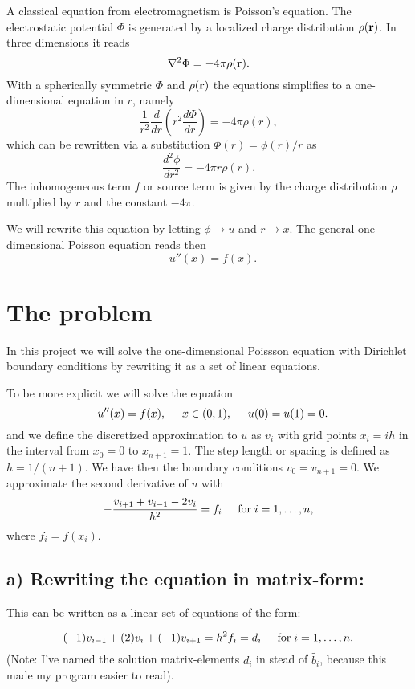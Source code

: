 \documentclass[norsk,a4paper,12pt]{article}
\begin{document}
A classical equation from electromagnetism is Poisson's equation.
The electrostatic potential $\Phi$ is generated by a localized charge
distribution $\rho ({\bf r})$.   In three dimensions 
it reads
\[
\nabla^2 \Phi = -4\pi \rho ({\bf r}).
\]
With a spherically symmetric $\Phi$ and $\rho ({\bf r})$  the equations
simplifies to a one-dimensional equation in $r$, namely
\[
\frac{1}{r^2}\frac{d}{dr}\left(r^2\frac{d\Phi}{dr}\right) = -4\pi \rho(r),
\]
which can be rewritten via a substitution $\Phi(r)= \phi(r)/r$ as
\[
\frac{d^2\phi}{dr^2}= -4\pi r\rho(r).
\]
The inhomogeneous term $f$ or source term is given by the charge distribution
$\rho$  multiplied by $r$ and the constant $-4\pi$.

We will rewrite this equation by letting $\phi\rightarrow u$ and 
$r\rightarrow x$. 
The general one-dimensional Poisson equation reads then 
\[
-u''(x) = f(x).
\]




\section{The problem}
In this project we will solve the one-dimensional Poissson equation
with Dirichlet boundary conditions by rewriting it as a set of linear equations.

To be more explicit we will solve the equation
\[
-u''(x) = f(x), \hspace{0.5cm} x\in(0,1), \hspace{0.5cm} u(0) = u(1) = 0.
\]
and we define the discretized approximation  to $u$ as $v_i$  with 
grid points $x_i=ih$   in the interval from $x_0=0$ to $x_{n+1}=1$.
The step length or spacing is defined as $h=1/(n+1)$. 
We have then the boundary conditions $v_0 = v_{n+1} = 0$.
We  approximate the second
derivative of $u$ with 
\[
   -\frac{v_{i+1}+v_{i-1}-2v_i}{h^2} = f_i  \hspace{0.5cm} \mathrm{for} \hspace{0.1cm} i=1,\dots,n,
\]
where $f_i=f(x_i)$.

\subsection*{a) Rewriting the equation in matrix-form:}

This can be written as a linear set of equations of the form:

\[
(-1) v_{i-1} + (2) v_i + (-1) v_{i+1} = h^2f_i = d_i \hspace{0.5cm} \mathrm{for} \hspace{0.1cm} i=1,\dots,n.
\]
(Note: I've named the solution matrix-elements $d_i$ in stead of $\tilde{b_i}$, because this made my program easier to read).
\end{document}
